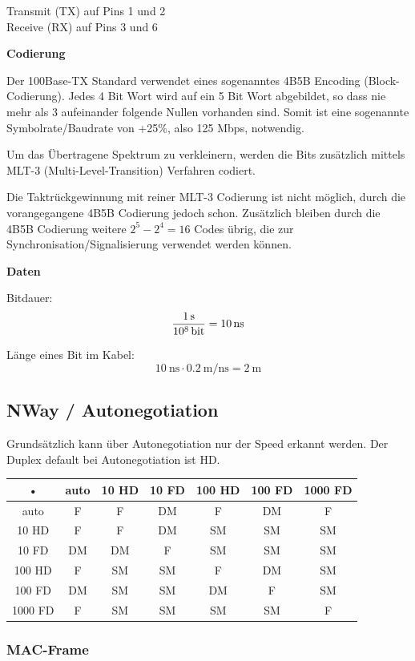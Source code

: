 Transmit (TX) auf Pins 1 und 2\\
Receive (RX) auf Pins 3 und 6

\textbf{Codierung}

Der 100Base-TX Standard verwendet eines sogenanntes 4B5B Encoding
(Block-Codierung). Jedes 4 Bit Wort wird auf ein 5 Bit Wort abgebildet, so dass
nie mehr als 3 aufeinander folgende Nullen vorhanden sind. Somit ist eine
sogenannte Symbolrate/Baudrate von +25\%, also 125 Mbps, notwendig.

Um das Übertragene Spektrum zu verkleinern, werden die Bits zusätzlich mittels
MLT-3 (Multi-Level-Transition) Verfahren codiert.

Die Taktrückgewinnung mit reiner MLT-3 Codierung ist nicht möglich, durch die
vorangegangene 4B5B Codierung jedoch schon. Zusätzlich bleiben durch die 4B5B
Codierung weitere $2^5-2^4=16$ Codes übrig, die zur
Synchronisation/Signalisierung verwendet werden können.

\textbf{Daten}

Bitdauer:
\[
	\frac{\SI{1}{\second}}{\SI{e8}{\bit}} = \SI{10}{\ns}
\]

Länge eines Bit im Kabel:
\[
	\SI{10}{\ns} \cdot \SI{0.2}{\meter\per\ns} = \SI{2}{\meter}
\]

\subsection{NWay / Autonegotiation}
Grundsätzlich kann über Autonegotiation nur der Speed erkannt werden. Der Duplex default bei Autonegotiation ist HD.
\begin{tabular}{|c|c|c|c|c|c|c|}
\hline 
• & auto & 10 HD & 10 FD & 100 HD & 100 FD & 1000 FD \\ 
\hline 
auto & F & F & DM & F & DM & F \\ 
\hline 
10 HD & F & F & DM & SM & SM & SM \\ 
\hline 
10 FD & DM & DM & F & SM & SM & SM \\ 
\hline 
100 HD & F & SM & SM & F & DM & SM \\ 
\hline 
100 FD & DM & SM & SM & DM & F & SM \\ 
\hline 
1000 FD & F & SM & SM & SM & SM & F \\ 
\hline 
\end{tabular} 

\subsubsection{MAC-Frame}

